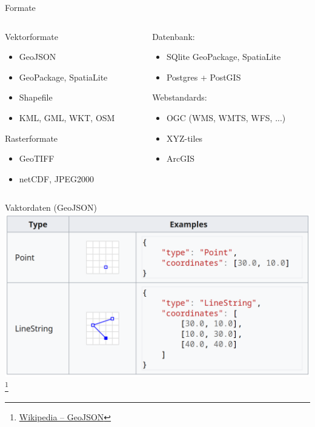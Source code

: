 \documentclass{beamer}
\begin{document}
		\begin{frame}{Formate}
			\begin{columns}[t]
				\begin{column}{0.47\textwidth}
					Vektorformate
					\begin{itemize}
						\item GeoJSON
						\item GeoPackage, SpatiaLite
						\item Shapefile
						\item KML, GML, WKT, OSM
					\end{itemize}
					\pause
					Rasterformate
					\begin{itemize}
						\item GeoTIFF
						\item netCDF, JPEG2000
					\end{itemize}
					\pause
				\end{column}
				\begin{column}{0.53\textwidth}
					Datenbank:
					\begin{itemize}
						\item SQlite \textrightarrow GeoPackage, SpatiaLite
						\item Postgres + PostGIS
					\end{itemize}
					\pause
					Webstandards:
					\begin{itemize}
						\item OGC (WMS, WMTS, WFS, ...)
						\item XYZ-tiles
						\item ArcGIS
					\end{itemize}
				\end{column}
			\end{columns}
		\end{frame}
		
		\begin{frame}{Vaktordaten (GeoJSON)}
			\includegraphics[width=\textwidth]{images/geodata-vector-1.png}\footnote{\href{https://en.wikipedia.org/wiki/GeoJSON}{Wikipedia -- GeoJSON}}
		\end{frame}
		
\end{document}
